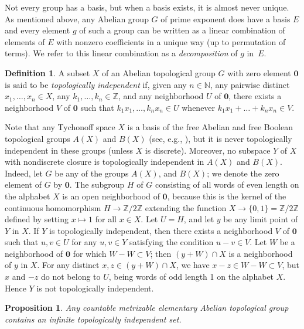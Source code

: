 \documentclass[12pt,a4paper]{amsart}
\newtheorem{proposition}{Proposition}
\theoremstyle{definition}
\newtheorem*{definition*}{Definition}
\newcommand{\zero}{{\mathbf 0}}
\begin{document}
Not every group has a basis, but when a basis exists, it is almost never unique. As mentioned above, any Abelian 
group $G$ of prime exponent does have a basis $E$ and every element $g$ of such a group can be written as a 
linear combination of elements of $E$ with nonzero coefficients in a unique way (up to permutation of terms). We 
refer to this linear combination as a \emph{decomposition} of $g$ in~$E$. 

\begin{definition*}
A subset $X$ of an Abelian topological group $G$ with zero element $\zero$ is said to be 
\emph{topologically independent} if, given any $n\in \mathbb N$, any pairwise distinct $x_1,\dots, 
x_n\in X$, any $k_1,\dots, k_n\in \mathbb Z$, and any neighborhood $U$ of $\zero$, there exists a neighborhood 
$V$ of $\zero$ such that $k_1 x_1, \dots, k_n x_n\in U$ whenever $k_1 x_1 +\dots +k_n x_n\in V$.
\end{definition*}

Note that any Tychonoff space $X$ is a basis of the free Abelian and free Boolean topological groups 
$A(X)$ and $B(X)$ (see, e.g., \cite{axioms}), but it is never topologically independent in these groups (unless $X$ is 
discrete). Moreover, no subspace $Y$ of $X$ with nondiscrete closure is topologically independent in 
$A(X)$ and $B(X)$. Indeed, let 
$G$ be any of the groups $A(X)$, and $B(X)$; we denote the zero element of $G$ by $\zero$. The subgroup $H$ of 
$G$ consisting of all words of even length on the alphabet $X$ is an open neighborhood of $\zero$, because this 
is the kernel of the continuous homomorphism $H\to \mathbb Z/2\mathbb Z$ extending the function 
$X\to \{0,1\}= \mathbb Z/2\mathbb Z$ defined by setting $x\mapsto 1$ for all $x\in X$. Let $U = H$, and let $y$ 
be any limit point of $Y$ in $X$. If $Y$ is topologically independent, then there exists a 
neighborhood $V$ of $\zero$ such that $u,v\in U$ for any $u,v\in Y$ satisfying the condition $u-v\in V$.  
Let $W$ be a neighborhood of $\zero$ for which $W-W\subset V$; then $(y+W)\cap X$ is a neighborhood of $y$ 
in $X$. For any distinct $x,z\in (y+W)\cap X$, we have $x-z\in W-W\subset V$, but $x$ and $-z$ do not belong 
to $U$, being words of odd length 1 on the alphabet $X$. Hence $Y$ is not topologically independent. 

\begin{proposition}
\label{p1}
Any countable metrizable elementary Abelian topological group contains an infinite topologically 
independent set. 
\end{proposition}
\end{document}
